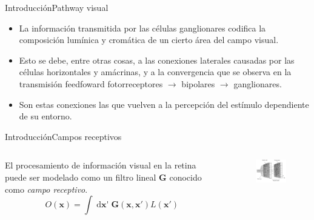 \documentclass[
    11pt, %
    aspectratio=169, %
]{beamer}
\begin{document}
\begin{frame}{Introducción}{Pathway visual}
    \begin{itemize}
                    \item {} La información transmitida por las células ganglionares codifica la composición lumínica y cromática de un cierto área del campo visual.
                    \item {} Esto se debe, entre otras cosas, a las conexiones laterales causadas por las células
                    horizontales y amácrinas, y a la convergencia que se observa en la transmisión feedfoward fotorreceptores $\rightarrow$ bipolares $\rightarrow$ ganglionares. 
                    \item {} Son estas conexiones las que vuelven a la percepción del estímulo dependiente de su entorno.
    \end{itemize} \end{frame}
    
\begin{frame}{Introducción}{Campos receptivos}
 \begin{columns}[c] %

    
		\begin{column}{0.45\textwidth}
  El procesamiento de información visual en la retina puede ser modelado como un filtro lineal $\mathbf{G}$ conocido como \emph{campo receptivo}.\newline
          \begin{equation*}
    O(\mathbf{x}) = \displaystyle\int \mathop{d\mathbf{x'}} \mathbf{G}(\mathbf{x},\mathbf{x}') L(\mathbf{x'})
\end{equation*}\newline
 
               
		\end{column}
  		\begin{column}{0.55\textwidth} %
                 \begin{figure}[h!]
                    \centering
                    \includegraphics[angle=0, width=5.5cm]{Images/intro/esquema_campo_receptivo.PNG}
                \end{figure}
		\end{column}		
	\end{columns}
        \end{frame}
\end{document}

